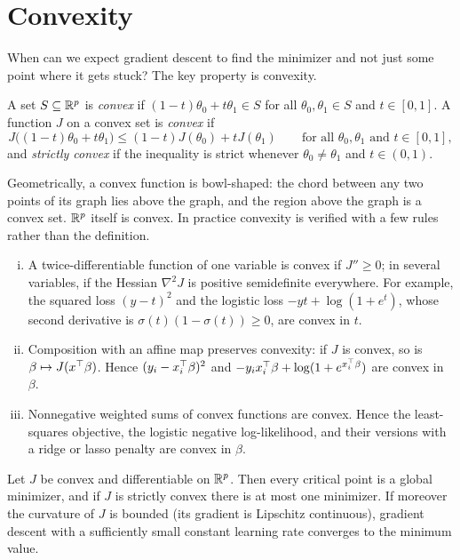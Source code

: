 \section{Convexity}\label{sec:convexity}

When can we expect gradient descent to find the minimizer and not just some point where it gets stuck? The key property is convexity.

\begin{definition}\label{def:convex}
A set $S\subseteq\mathbb{R}^p$ is \emph{convex} if $(1-t)\theta_0+t\theta_1\in S$ for all $\theta_0,\theta_1\in S$ and $t\in[0,1]$. A function $J$ on a convex set is \emph{convex} if
\[
J\big((1-t)\theta_0+t\theta_1\big)\le(1-t)J(\theta_0)+tJ(\theta_1)\qquad\text{for all }\theta_0,\theta_1\text{ and }t\in[0,1],
\]
and \emph{strictly convex} if the inequality is strict whenever $\theta_0\ne\theta_1$ and $t\in(0,1)$.
\end{definition}

Geometrically, a convex function is bowl-shaped: the chord between any two points of its graph lies above the graph, and the region above the graph is a convex set. $\mathbb{R}^p$ itself is convex. In practice convexity is verified with a few rules rather than the definition.

\begin{enumerate}[(i)]
  \item A twice-differentiable function of one variable is convex if $J''\ge0$; in several variables, if the Hessian $\nabla^2J$ is positive semidefinite everywhere. For example, the squared loss $(y-t)^2$ and the logistic loss $-yt+\log(1+e^t)$, whose second derivative is $\sigma(t)(1-\sigma(t))\ge0$, are convex in $t$.
  \item Composition with an affine map preserves convexity: if $J$ is convex, so is $\beta\mapsto J(x^{\top}\beta)$. Hence $(y_i-x_i^{\top}\beta)^2$ and $-y_ix_i^{\top}\beta+\log(1+e^{x_i^{\top}\beta})$ are convex in $\beta$.
  \item Nonnegative weighted sums of convex functions are convex. Hence the least-squares objective, the logistic negative log-likelihood, and their versions with a ridge or lasso penalty are convex in $\beta$.
\end{enumerate}

\begin{proposition}\label{prop:convex-min}
Let $J$ be convex and differentiable on $\mathbb{R}^p$. Then every critical point is a global minimizer, and if $J$ is strictly convex there is at most one minimizer. If moreover the curvature of $J$ is bounded (its gradient is Lipschitz continuous), gradient descent with a sufficiently small constant learning rate converges to the minimum value.
\end{proposition}

